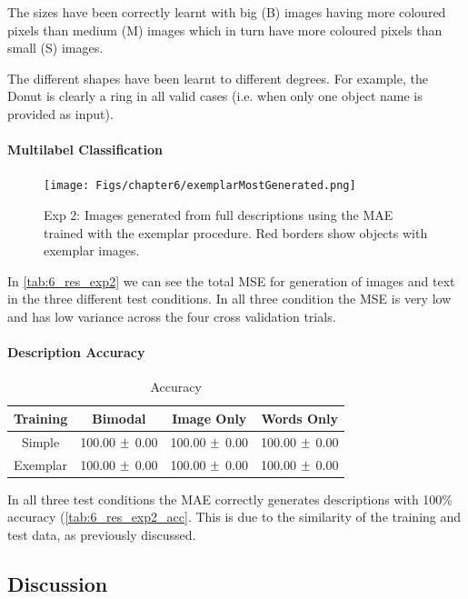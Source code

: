 The sizes have been correctly learnt with big (B) images having more coloured pixels than medium (M) images which in turn have more coloured pixels than small (S) images.

The different shapes have been learnt to different degrees. For example, the Donut is clearly a ring in all valid cases (i.e. when only one object name is provided as input).



\paragraph{Multilabel Classification}

\begin{figure}[ht]
    \centering
    \texttt{[image: Figs/chapter6/exemplarMostGenerated.png]}
    \caption{Exp 2: Images generated from full descriptions using the \ac{MAE} trained with the exemplar procedure. Red borders show objects with exemplar images.}
    \label{fig:mostExemplarGen}
\end{figure}

In \autoref{tab:6_res_exp2} we can see the total \ac{MSE} for generation of images and text in the three different test conditions. In all three condition the \ac{MSE} is very low and has low variance across the four cross validation trials.

\paragraph{Description Accuracy}
\begin{table}[h!]
\centering
	\begin{tabular}{|c|c|c|c|}
	\hline
\textbf{Training}	 & 	\textbf{Bimodal} & \textbf{Image Only} 	& 	\textbf{Words Only} \\ \hline
Simple &  100.00 $\mypm$ 0.00 & 100.00 $\mypm$ 0.00 & 100.00 $\mypm$ 0.00 \\ \hline
Exemplar & 100.00 $\mypm$ 0.00 & 100.00 $\mypm$ 0.00 & 100.00 $\mypm$ 0.00 \\ \hline
\end{tabular}
\caption{Accuracy}
\label{tab:6_res_exp2_acc}
\end{table}


In all three test conditions the \ac{MAE} correctly generates descriptions with 100\% accuracy (\autoref{tab:6_res_exp2_acc}. This is due to the similarity of the training and test data, as previously discussed.

\subsection{Discussion}

